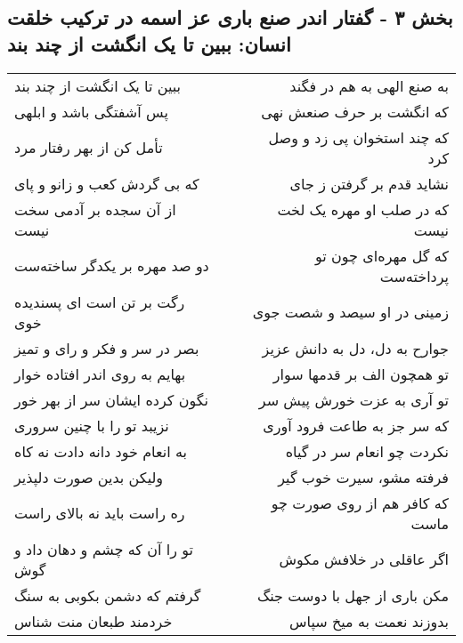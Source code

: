 \begin{center}
\section*{بخش ۳ - گفتار اندر صنع باری عز اسمه در  ترکیب خلقت انسان: ببین تا یک انگشت از چند بند}
\label{sec:003}
\begin{longtable}{l p{0.5cm} r}
ببین تا یک انگشت از چند بند
&&
به صنع الهی به هم در فگند
\\
پس آشفتگی باشد و ابلهی
&&
که انگشت بر حرف صنعش نهی
\\
تأمل کن از بهر رفتار مرد
&&
که چند استخوان پی زد و وصل کرد
\\
که بی گردش کعب و زانو و پای
&&
نشاید قدم بر گرفتن ز جای
\\
از آن سجده بر آدمی سخت نیست
&&
که در صلب او مهره یک لخت نیست
\\
دو صد مهره بر یکدگر ساخته‌ست
&&
که گل مهره‌ای چون تو پرداخته‌ست
\\
رگت بر تن است ای پسندیده خوی
&&
زمینی در او سیصد و شصت جوی
\\
بصر در سر و فکر و رای و تمیز
&&
جوارح به دل، دل به دانش عزیز
\\
بهایم به روی اندر افتاده خوار
&&
تو همچون الف بر قدمها سوار
\\
نگون کرده ایشان سر از بهر خور
&&
تو آری به عزت خورش پیش سر
\\
نزیبد تو را با چنین سروری
&&
که سر جز به طاعت فرود آوری
\\
به انعام خود دانه دادت نه کاه
&&
نکردت چو انعام سر در گیاه
\\
ولیکن بدین صورت دلپذیر
&&
فرفته مشو، سیرت خوب گیر
\\
ره راست باید نه بالای راست
&&
که کافر هم از روی صورت چو ماست
\\
تو را آن که چشم و دهان داد و گوش
&&
اگر عاقلی در خلافش مکوش
\\
گرفتم که دشمن بکوبی به سنگ
&&
مکن باری از جهل با دوست جنگ
\\
خردمند طبعان منت شناس
&&
بدوزند نعمت به میخ سپاس
\\
\end{longtable}
\end{center}
